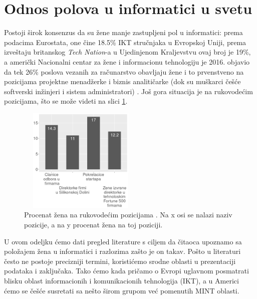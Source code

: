 \section{Odnos polova u informatici u svetu}
\label{sec:usvetu}
Postoji širok konsenzus da su žene manje zastupljeni pol u informatici: prema podacima Eurostata, one čine 18.5\% IKT stručnjaka u Evropskoj Uniji,\cite{gendergap-eu} prema izveštaju britanskog \emph{Tech Nation}-a u Ujedinjenom Kraljevstvu ovaj broj je 19\%,\cite{gendergap-uk} a američki Nacionalni centar za žene i informacionu tehnologiju je 2016. objavio da tek 26\% poslova vezanih za računarstvo obavljaju žene i to prvenstveno na pozicijama projektne menadžerke i biznis analitičarke (dok su muškarci češće softverski inžinjeri i sistem administratori) \cite{gendergap-us}. Još gora situacija je na rukovodećim pozicijama, što se može videti na slici \ref{fig:rukovodece}.

\begin{figure}[h!]
\begin{center}
\includegraphics[width=6cm, height=5cm]{zene-na-rukovodecim-pozicijama.png}
\end{center}
\caption{Procenat žena na rukovodećim pozicijama \cite{leadership-women}. Na x osi se nalazi naziv pozicije, a na y procenat žena na toj poziciji.}
\label{fig:rukovodece}
\end{figure}

U ovom odeljku ćemo dati pregled literature s ciljem da čitaoca upoznamo sa položajem žena u informatici i razlozima zašto je on takav. Pošto u literaturi često ne postoje precizniji termini, koristićemo srodne oblasti u prezentaciji podataka i zaključaka. Tako ćemo kada pričamo o Evropi uglavnom posmatrati blisku oblast informacionih i komunikacionih tehnologija (IKT), a u Americi ćemo se češće susretati sa nešto širom grupom već pomenutih MINT oblasti.

